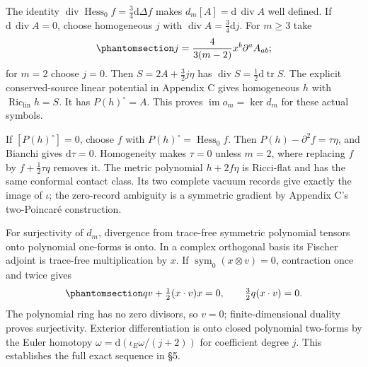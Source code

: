 \documentclass[
  english,
  11pt,
  reqno]{amsart}
\begin{document}
The identity
\(\operatorname{div}\operatorname{Hess}_0f=\frac34\mathrm d\Delta f\)
makes \(d_m[A]=\mathrm d\,\operatorname{div}A\) well defined. If
\(\mathrm d\,\operatorname{div}A=0\), choose homogeneous \(j\) with
\(\operatorname{div}A=\frac34\mathrm dj\). For \(m\ge3\) take
\begin{equation}\protect\phantomsection\label{eq:gg-app-compatible-trace}{
 j=\frac4{3(m-2)}x^b\partial^aA_{ab};
}\end{equation} for \(m=2\) choose \(j=0\). Then \(S=2A+\frac32j\eta\)
has \(\operatorname{div}S=\frac12\mathrm d\operatorname{tr}S\). The
explicit conserved-source linear potential in Appendix C gives
homogeneous \(h\) with \(\operatorname{Ric}_{\mathrm{lin}}h=S\). It has
\(P(h)^\circ=A\). This proves \(\operatorname{im}o_m=\ker d_m\) for
these actual symbols.

If \([P(h)^\circ]=0\), choose \(f\) with
\(P(h)^\circ=\operatorname{Hess}_0f\). Then
\(P(h)-\partial^2f=\tau\eta\), and Bianchi gives \(\mathrm d\tau=0\).
Homogeneity makes \(\tau=0\) unless \(m=2\), where replacing \(f\) by
\(f+\frac12\tau q\) removes it. The metric polynomial \(h+2f\eta\) is
Ricci-flat and has the same conformal contact class. Its two complete
vacuum records give exactly the image of \(\iota\); the zero-record
ambiguity is a symmetric gradient by Appendix C's two-Poincaré
construction.

For surjectivity of \(d_m\), divergence from trace-free symmetric
polynomial tensors onto polynomial one-forms is onto. In a complex
orthogonal basis its Fischer adjoint is trace-free multiplication by
\(x\). If \(\operatorname{sym}_0(x\otimes v)=0\), contraction once and
twice gives
\begin{equation}\protect\phantomsection\label{eq:gg-app-divergence-adjoint-injectivity}{
 qv+\tfrac12(x\cdot v)x=0,\qquad
 \tfrac32q(x\cdot v)=0.
}\end{equation} The polynomial ring has no zero divisors, so \(v=0\);
finite-dimensional duality proves surjectivity. Exterior differentiation
is onto closed polynomial two-forms by the Euler homotopy
\(\omega=\mathrm d(\iota_E\omega/(j+2))\) for coefficient degree \(j\).
This establishes the full exact sequence in §5.
\end{document}
